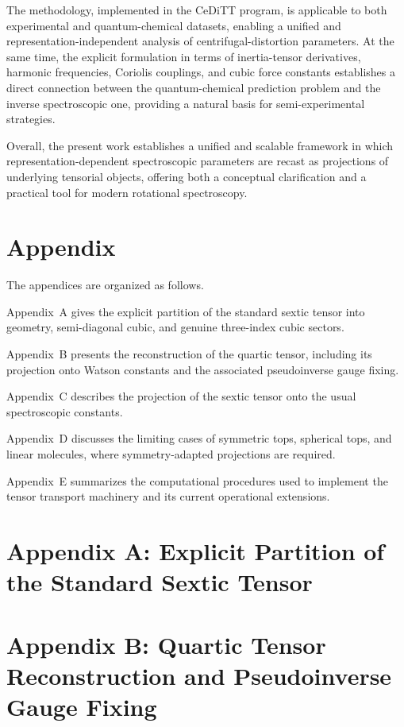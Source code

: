\documentclass[aip,jcp,reprint,floatfix]{revtex4-2}
\begin{document}
The methodology, implemented in the CeDiTT program, is applicable to
both experimental and quantum-chemical datasets, enabling a unified and
representation-independent analysis of centrifugal-distortion
parameters. At the same time, the explicit formulation in terms of
inertia-tensor derivatives, harmonic frequencies, Coriolis couplings,
and cubic force constants establishes a direct connection between the
quantum-chemical prediction problem and the inverse spectroscopic one,
providing a natural basis for semi-experimental strategies.

Overall, the present work establishes a unified and scalable framework
in which representation-dependent spectroscopic parameters are recast
as projections of underlying tensorial objects, offering both a
conceptual clarification and a practical tool for modern rotational
spectroscopy.


\section{Appendix}

The appendices are organized as follows.

Appendix~A gives the explicit partition of the standard sextic tensor
into geometry, semi-diagonal cubic, and genuine three-index cubic
sectors.

Appendix~B presents the reconstruction of the quartic tensor,
including its projection onto Watson constants and the associated
pseudoinverse gauge fixing.

Appendix~C describes the projection of the sextic tensor onto the usual
spectroscopic constants.

Appendix~D discusses the limiting cases of symmetric tops, spherical
tops, and linear molecules, where symmetry-adapted projections are
required.

Appendix~E summarizes the computational procedures used to implement
the tensor transport machinery and its current operational extensions.


\section{Appendix A: Explicit Partition of the Standard Sextic Tensor}



\section{Appendix B: Quartic Tensor Reconstruction and Pseudoinverse Gauge Fixing}
\end{document}
